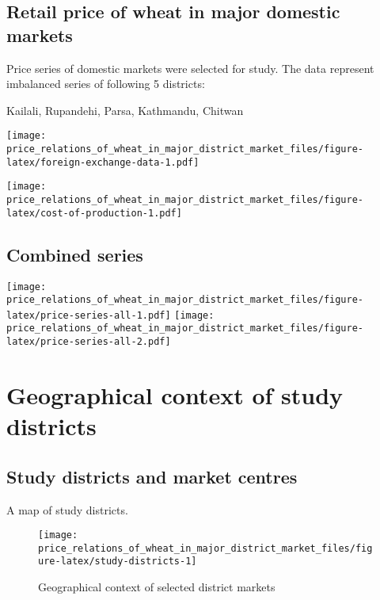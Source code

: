 \documentclass[
  12pt,
]{article}
\begin{document}
\hypertarget{retail-price-of-wheat-in-major-domestic-markets}{%
\subsection{Retail price of wheat in major domestic markets}\label{retail-price-of-wheat-in-major-domestic-markets}}

Price series of domestic markets were selected for study. The data represent imbalanced series of following 5 districts:

Kailali, Rupandehi, Parsa, Kathmandu, Chitwan

\texttt{[image: price\_relations\_of\_wheat\_in\_major\_district\_market\_files/figure-latex/foreign-exchange-data-1.pdf]}

\texttt{[image: price\_relations\_of\_wheat\_in\_major\_district\_market\_files/figure-latex/cost-of-production-1.pdf]}

\hypertarget{combined-series}{%
\subsection{Combined series}\label{combined-series}}

\texttt{[image: price\_relations\_of\_wheat\_in\_major\_district\_market\_files/figure-latex/price-series-all-1.pdf]} \texttt{[image: price\_relations\_of\_wheat\_in\_major\_district\_market\_files/figure-latex/price-series-all-2.pdf]}

\hypertarget{geographical-context-of-study-districts}{%
\section{Geographical context of study districts}\label{geographical-context-of-study-districts}}

\hypertarget{study-districts-and-market-centres}{%
\subsection{Study districts and market centres}\label{study-districts-and-market-centres}}

A map of study districts.

\begin{figure}
\texttt{[image: price\_relations\_of\_wheat\_in\_major\_district\_market\_files/figure-latex/study-districts-1]} \caption{Geographical context of selected district markets}\label{fig:study-districts}
\end{figure}
\end{document}

